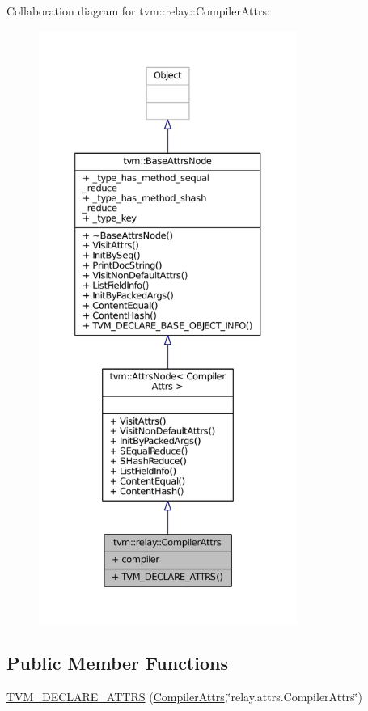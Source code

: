 Collaboration diagram for tvm\+:\+:relay\+:\+:Compiler\+Attrs\+:
\nopagebreak
\begin{figure}[H]
\begin{center}
\leavevmode
\includegraphics[height=550pt]{structtvm_1_1relay_1_1CompilerAttrs__coll__graph}
\end{center}
\end{figure}
\subsection*{Public Member Functions}
\begin{DoxyCompactItemize}
\item 
\hyperlink{structtvm_1_1relay_1_1CompilerAttrs_a25131f3217c111a7bcf4682d056495be}{T\+V\+M\+\_\+\+D\+E\+C\+L\+A\+R\+E\+\_\+\+A\+T\+T\+RS} (\hyperlink{structtvm_1_1relay_1_1CompilerAttrs}{Compiler\+Attrs},\char`\"{}relay.\+attrs.\+Compiler\+Attrs\char`\"{})
\end{DoxyCompactItemize}
